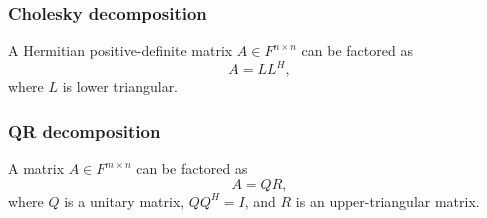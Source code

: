 \subsubsection{Cholesky decomposition}

A Hermitian positive-definite matrix $A \in F^{n \times n}$ can be factored as
\begin{equation*}
A = LL^H,
\end{equation*}
where $L$ is lower triangular.

\subsubsection{QR decomposition}

A matrix $A \in F^{m \times n}$ can be factored as
\begin{equation*}
A = Q R,
\end{equation*}
where $Q$ is a unitary matrix, $QQ^H = I$, and $R$ is an upper-triangular matrix.

